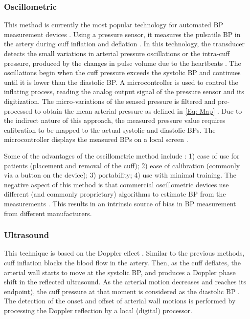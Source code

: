 \documentclass[journal,article,moreauthors]{Definitions/mdpi}
\begin{document}
\subsubsection{Oscillometric} This method is currently the most popular technology for automated BP measurement devices \citep{worldtechnical}. Using a pressure sensor, it measures the pulsatile BP in the artery during cuff inflation and deflation \citep{rastegar2020non}. In this technology, the transducer detects the small variations in arterial pressure oscillations or the intra-cuff pressure, produced by the changes in pulse volume due to the heartbeats \citep{worldtechnical}. The oscillations begin when the cuff pressure exceeds the systolic BP and continues until it is lower than the diastolic BP. A microcontroller is used to control the inflating process, reading the analog output signal of the pressure sensor and its digitization. The micro-variations of the sensed pressure is filtered and pre-processed to obtain the mean arterial pressure as defined in \eqref{Eq: Map} \citep{worldtechnical}. Due to the indirect nature of this approach, the measured pressure value requires calibration to be mapped to the actual systolic and diastolic BPs. The microcontroller displays the measured BPs on a local screen \citep{Kumar2021-em}.

Some of the advantages of the oscillometric method include \citep{Kumar2021-em, worldtechnical}: 1) ease of use for patients (placement and removal of the cuff); 2) ease of calibration (commonly via a button on the device); 3) portability; 4) use with minimal training. The negative aspect of this method is that commercial oscillometric devices use different (and commonly proprietary) algorithms to estimate BP from the measurements \citep{ogedegbe2010principles}. This results in an intrinsic source of bias in BP measurement from different manufacturers.

\subsubsection{Ultrasound} This technique is based on the Doppler effect \citep{worldtechnical}. Similar to the previous methods, cuff inflation blocks the blood flow in the artery. Then, as the cuff deflates, the arterial wall starts to move at the systolic BP, and produces a Doppler phase shift in the reflected ultrasound. As the arterial motion decreases and reaches its endpoint), the cuff pressure at that moment is considered as the diastolic BP \citep{Kumar2021-em}. The detection of the onset and offset of arterial wall motions is performed by processing the Doppler reflection by a local (digital) processor.
\end{document}
